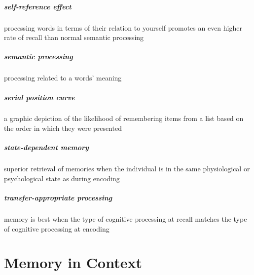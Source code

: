 \documentclass[
]{krantz}
\begin{document}
\paragraph*{self-reference effect}\label{self-reference-effect}

processing words in terms of their relation to yourself promotes an even higher rate of recall than normal semantic processing

\paragraph*{semantic processing}\label{semantic-processing}

processing related to a words' meaning

\paragraph*{serial position curve}\label{serial-position-curve}

a graphic depiction of the likelihood of remembering items from a list based on the order in which they were presented

\paragraph*{state-dependent memory}\label{state-dependent-memory}

superior retrieval of memories when the individual is in the same physiological or psychological state as during encoding

\paragraph*{transfer-appropriate processing}\label{transfer-appropriate-processing}

memory is best when the type of cognitive processing at recall matches the type of cognitive processing at encoding

\chapter{Memory in Context}\label{memory-in-context}
\end{document}
